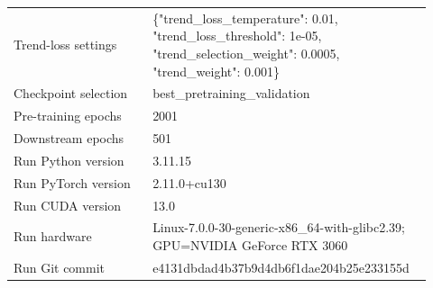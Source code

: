 \begin{table}[p]
\begin{tabular}{p{0.32\linewidth}p{0.60\linewidth}}
Trend-loss settings & \{"trend\_loss\_temperature": 0.01, "trend\_loss\_threshold": 1e-05, "trend\_selection\_weight": 0.0005, "trend\_weight": 0.001\} \\
Checkpoint selection & best\_pretraining\_validation \\
Pre-training epochs & 2001 \\
Downstream epochs & 501 \\
Run Python version & 3.11.15 \\
Run PyTorch version & 2.11.0+cu130 \\
Run CUDA version & 13.0 \\
Run hardware & Linux-7.0.0-30-generic-x86\_64-with-glibc2.39; GPU=NVIDIA GeForce RTX 3060 \\
Run Git commit & e4131dbdad4b37b9d4db6f1dae204b25e233155d \\
\bottomrule
\end{tabular}
\end{table}

